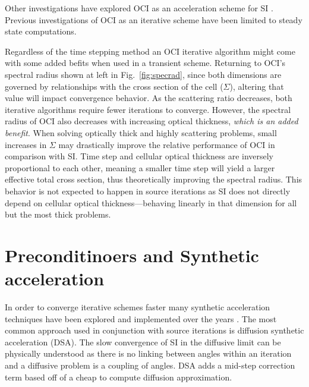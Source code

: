 Other investigations have explored OCI as an acceleration scheme for SI \cite{anistratov_iterative_2015, hoagland_hybrid_2021}. %
Previous investigations of OCI as an iterative scheme have been limited to steady state computations.

Regardless of the time stepping method an OCI iterative algorithm might come with some added befits when used in a transient scheme.
Returning to OCI's spectral radius shown at left in Fig.~\ref{fig:specrad}, since both dimensions are governed by relationships with the cross section of the cell ($\Sigma$), altering that value will impact convergence behavior. 
As the scattering ratio decreases, both iterative algorithms require fewer iterations to converge.
However, the spectral radius of OCI also decreases with increasing optical thickness, \textit{which is an added benefit}.
When solving optically thick and highly scattering problems, small increases in $\Sigma$ may drastically improve the relative performance of OCI in comparison with SI.
Time step and cellular optical thickness are inversely proportional to each other, meaning a smaller time step will yield a larger effective total cross section, thus theoretically improving the spectral radius.
This behavior is not expected to happen in source iterations as SI does not directly depend on cellular optical thickness---behaving linearly in that dimension for all but the most thick problems.

\section{Preconditinoers and Synthetic acceleration}

\label{sec:syn_acc}
In order to converge iterative schemes faster many synthetic acceleration techniques have been explored and implemented over the years \cite{adams_fast_2002}.
The most common approach used in conjunction with source iterations is diffusion synthetic acceleration (DSA)\cite{adams_fast_2002}.
The slow convergence of SI in the diffusive limit can be physically understood as there is no linking between angles within an iteration and a diffusive problem is a coupling of angles.
DSA adds a mid-step correction term based off of a cheap to compute diffusion approximation.

